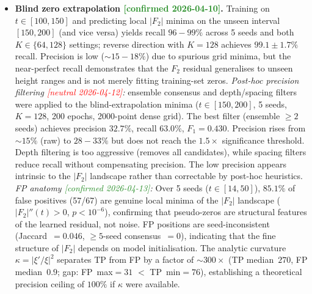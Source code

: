 \documentclass[11pt, a4paper]{article}
\theoremstyle{definition}
\theoremstyle{plain}
\newcommand{\xif}{\xi}                      %
\newcommand{\Lpqo}{\mathcal{L}_{\mathrm{pqo}}}
\newcommand{\Ltgt}{\mathcal{L}_{\mathrm{tgt}}}
\newcommand{\Lres}{\mathcal{L}_{\mathrm{res}}}
\begin{document}
\begin{itemize}
        global $|F_2|$ by $5.2\%$ (3-seed ensemble), indicating
        that the angular target $\Ltgt$ synergises with $\Lres$
        and $\Lpqo$ and should not be replaced wholesale.  The
        smooth target remains valid as an \emph{isolation diagnostic}
        but not as a drop-in substitute for the full pipeline.
  \item \textbf{Blind zero extrapolation
        \textcolor{ForestGreen}{[confirmed 2026-04-10]}.}
        Training on $t\in[100,150]$ and predicting local $|F_2|$
        minima on the unseen interval $[150,200]$ (and vice versa)
        yields recall $96{-}99\%$ across 5 seeds and both
        $K\in\{64,128\}$ settings; reverse direction with
        $K=128$ achieves $99.1\pm1.7\%$ recall.  Precision is low
        ($\sim\!15{-}18\%$) due to spurious grid minima, but the
        near-perfect recall demonstrates that the $F_2$ residual
        generalises to unseen height ranges and is not merely
        fitting training-set zeros.
        \emph{Post-hoc precision filtering
        \textcolor{red}{[neutral 2026-04-12]}:}
        ensemble consensus and depth/spacing filters were applied
        to the blind-extrapolation minima ($t\in[150,200]$,
        5 seeds, $K=128$, 200 epochs, 2000-point dense grid).
        The best filter (ensemble $\ge 2$ seeds) achieves
        precision $32.7\%$, recall $63.0\%$, $F_1=0.430$.
        Precision rises from ${\sim}15\%$ (raw) to $28{-}33\%$
        but does not reach the $1.5\times$ significance threshold.
        Depth filtering is too aggressive (removes all candidates),
        while spacing filters reduce recall without compensating
        precision.  The low precision appears intrinsic to the
        $|F_2|$ landscape rather than correctable by post-hoc
        heuristics.
        \emph{FP anatomy
        \textcolor{ForestGreen}{[confirmed 2026-04-13]}:}
        Over 5 seeds ($t\in[14,50]$), $85.1\%$ of false positives
        (57/67) are genuine local minima of the $|F_2|$ landscape
        ($|F_2|''(t)>0$, $p<10^{-6}$), confirming that pseudo-zeros
        are structural features of the learned residual, not noise.
        FP positions are seed-inconsistent (Jaccard~$=0.046$,
        $\ge\!5$-seed consensus~$=0$), indicating that the fine
        structure of $|F_2|$ depends on model initialisation.
        The analytic curvature $\kappa=|\xif'/\xif|^2$ separates
        TP from FP by a factor of ${\sim}300\times$
        (TP median~$270$, FP median~$0.9$; gap: FP~max${}=31$
        $<$ TP~min${}=76$), establishing a theoretical precision
        ceiling of $100\%$ if $\kappa$ were available.

\end{itemize}
\end{document}
